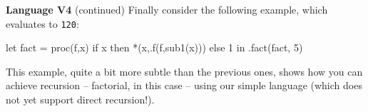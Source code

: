 \begin{minipage}[t]{\sw}
\slidenumber
\LARGE
{\bf Language V4} (continued)\exx
Finally consider the following example,
which evaluates to \verb'120':
\Large
\begin{qv}
let
  fact = proc(f,x)
    if x
    then *(x,.f(f,sub1(x)))
    else 1
in
  .fact(fact, 5)
\end{qv}
\LARGE
This example,
quite a bit more subtle than the previous ones,
shows how you can achieve recursion --
factorial, in this case --
using our simple language (which does not yet support direct recursion!).
\end{minipage}
\clearpage
